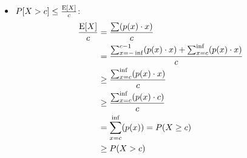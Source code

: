 \begin{itemize}
\item{$P[X>c] \leq \frac{\mathrm{E}[X]}{c}$:
\begin{align*}
\frac{\mathrm{E}[X]}{c} &= \frac{\sum (p(x) \cdot x)}{c} \\
 &= \frac{\sum_{x = -\inf}^{c-1} (p(x) \cdot x) + \sum_{x = c}^{\inf} (p(x) \cdot x)}{c} \\
 &\ge \frac{\sum_{x = c}^{\inf} (p(x) \cdot x)}{c} \\
 &\ge \frac{\sum_{x = c}^{\inf} (p(x) \cdot c)}{c} \\
 &= \sum_{x = c}^{\inf} (p(x)) = P(X \ge c ) \\
 &\ge P(X > c )
\end{align*}}
\end{itemize}

